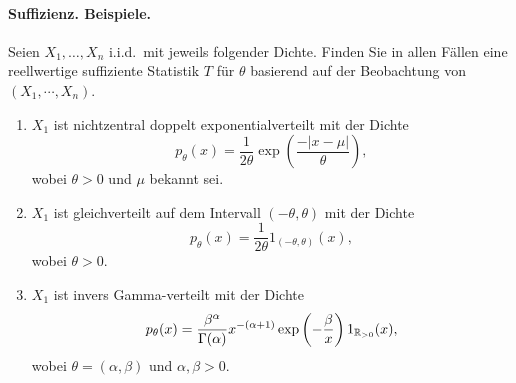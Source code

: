 \paragraph{Suffizienz. Beispiele.} 
Seien $X_1,\ldots,X_n$ i.i.d.\ mit jeweils folgender Dichte. Finden Sie in
allen Fällen eine reellwertige suffiziente Statistik $T$ für $\theta$ basierend
auf der Beobachtung von $(X_1, \cdots, X_n)$. 
\begin{enumerate}
	\item $X_1$ ist nichtzentral doppelt exponentialverteilt mit der Dichte 
        \begin{equation*}
            p_\theta (x) = \frac{1}{2\theta} \exp \left( \frac{-|x-\mu|}{\theta} \right),
        \end{equation*}
        wobei $\theta >0$ und $\mu$ bekannt sei.
	\item $X_1$ ist gleichverteilt auf dem Intervall $(-\theta,\theta)$ mit der Dichte 
        \begin{equation*}
            p_\theta (x) = \frac{1}{2\theta} 1_{\left( -\theta ,\theta \right)}(x),
        \end{equation*}
        wobei $\theta >0$.
	\item $X_1$ ist invers Gamma-verteilt mit der Dichte 
        \begin{equation*}
            p_\theta (x) = \frac{\beta^\alpha}{\Gamma(\alpha)} x^{- (\alpha+1)} 
            \exp\left(  -\frac{\beta}{x} \right) 1_{\mathbb R_{>0}}(x), 
        \end{equation*}
        wobei $\theta = (\alpha, \beta)$ und $\alpha, \beta > 0$.
\end{enumerate}

